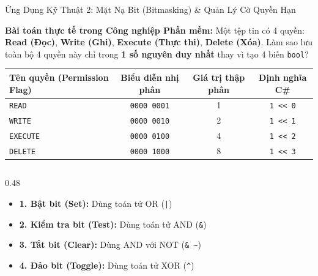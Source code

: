 \documentclass[aspectratio=169, 10pt]{beamer}
\begin{document}
\begin{frame}[fragile]{Ứng Dụng Kỹ Thuật 2: Mặt Nạ Bit (Bitmasking) \& Quản Lý Cờ Quyền Hạn}
  \begin{block}{\textbf{Bài toán thực tế trong Công nghiệp Phần mềm:}}
    Một tệp tin có 4 quyền: \textbf{Read (Đọc)}, \textbf{Write (Ghi)}, \textbf{Execute (Thực thi)}, \textbf{Delete (Xóa)}. Làm sao lưu toàn bộ 4 quyền này chỉ trong \textbf{1 số nguyên duy nhất} thay vì tạo 4 biến \texttt{bool}?
  \end{block}

  \begin{table}[h]
    \centering
    \small
    \begin{tabular}{l c c c}
      \toprule
      \textbf{Tên quyền (Permission Flag)} & \textbf{Biểu diễn nhị phân} & \textbf{Giá trị thập phân} & \textbf{Định nghĩa C\#} \\
      \midrule
      \texttt{READ} & \texttt{0000 0001} & 1 & \texttt{1 << 0} \\
      \texttt{WRITE} & \texttt{0000 0010} & 2 & \texttt{1 << 1} \\
      \texttt{EXECUTE} & \texttt{0000 0100} & 4 & \texttt{1 << 2} \\
      \texttt{DELETE} & \texttt{0000 1000} & 8 & \texttt{1 << 3} \\
      \bottomrule
    \end{tabular}
  \end{table}

  \begin{columns}[T]
    \begin{column}{0.48\textwidth}
      \begin{tcolorbox}[colback=UniLightBlue!30,colframe=UniBlue,title=\textbf{4 Thao tác nòng cốt với Bitmask},fonttitle=\scriptsize\bfseries]
        \begin{itemize}\scriptsize
          \item \textbf{1. Bật bit (Set):} Dùng toán tử OR (\texttt{|})
          \item \textbf{2. Kiểm tra bit (Test):} Dùng toán tử AND (\texttt{\&})
          \item \textbf{3. Tắt bit (Clear):} Dùng AND với NOT (\texttt{\& \textasciitilde})
          \item \textbf{4. Đảo bit (Toggle):} Dùng toán tử XOR (\texttt{\textasciicircum})
        \end{itemize}
      \end{tcolorbox}
    \end{column}


\end{columns}
\end{frame}
\end{document}
